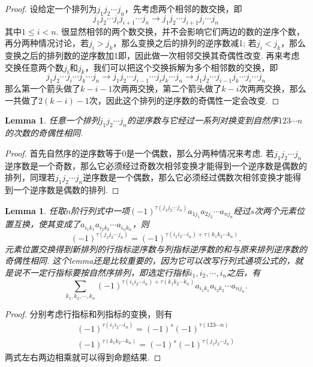 \documentclass{article}
\newtheorem{lemma}[theorem]{Lemma}
\begin{document}
\begin{proof}
设给定一个排列为$j_1j_2\cdots j_n$，先考虑两个相邻的数交换，即
$$
j_1j_2\cdots j_{i}j_{i+1}\cdots j_n \longrightarrow j_1j_2\cdots j_{i+1}j_{i}\cdots j_n
$$
其中$1\leq i <n$. 很显然相邻的两个数交换，并不会影响它们两边的数的逆序个数，再分两种情况讨论，若$j_i > j_k$，那么变换之后的排列的逆序数减1; 若$j_i < j_k$，那么变换之后的排列数的逆序数加1即，因此做一次相邻交换其奇偶性改变. 再来考虑交换任意两个数$j_i$和$j_k$，我们可以把这个交换拆解为多个相邻数的交换，即
$$
j_1j_2\cdots j_{i}\cdots j_{k}\cdots j_n \longrightarrow j_1j_2\cdots j_{i-1}\cdots j_{i}j_{k}\cdots j_n \longrightarrow j_1j_2\cdots j_{i-1}j_k\cdots j_{i}\cdots j_n
$$
那么第一个箭头做了$k-i-1$次两两交换，第二个箭头做了$k-i$次两两交换，那么一共做了$2(k-i)-1$次，因此这个排列的逆序数的奇偶性一定会改变.
\end{proof}

\begin{lemma}\label{det: nixu2}
\rm 任意一个排列$j_1j_2\cdots j_n$的逆序数与它经过一系列对换变到自然序$123\cdots n$的次数的奇偶性相同.
\end{lemma}

\begin{proof}
首先自然序的逆序数等于0是一个偶数，那么分两种情况来考虑. 若$j_1j_2\cdots j_n$逆序数是一个奇数，那么它必须经过奇数次相邻变换才能得到一个逆序数是偶数的排列，同理若$j_1j_2\cdots j_n$逆序数是一个偶数，那么它必须经过偶数次相邻变换才能得到一个逆序数是偶数的排列.
\end{proof}


\begin{lemma}\label{det: nixu3}
\rm 任取$n$阶行列式中一项$(-1)^{\tau(j_1j_2\cdots j_n)}a_{1j_1}a_{2j_2}\cdots a_{nj_n}$经过$s$次两个元素位置互换，使其变成了$a_{i_1k_1}a_{i_2k_2}\cdots a_{i_nk_n}$，则
$$
(-1)^{\tau(j_1j_2\cdots j_n)} = (-1)^{\tau(i_1i_2\cdots i_n)+\tau(k_1k_2\cdots k_n)}.
$$
{\color{blue} 元素位置交换得到新排列的行指标逆序数与列指标逆序数的和与原来排列逆序数的奇偶性相同}. {\color{red} 这个lemma还是比较重要的，因为它可以改写行列式通项公式的，就是说不一定行指标要按自然序排列}，即选定行指标$i_1,i_2,\cdots,i_n$之后，有
$$
\sum\limits_{k_1,k_2,\cdots,k_n}(-1)^{\tau(i_1i_2\cdots i_n) + \tau(k_1k_2\cdots k_n)}a_{i_1k_1}a_{i_2k_2}\cdots a_{nj_n}.
$$
\end{lemma}

\begin{proof}
分别考虑行指标和列指标的变换，则有
$$
\begin{array}{ll}
(-1)^{\tau(i_1i_2\cdots i_n)} = (-1)^s (-1)^{\tau(123\cdots n)} \\
(-1)^{\tau(k_1k_2\cdots k_n)} = (-1)^s (-1)^{\tau(j_1j_2\cdots j_n)}
\end{array}
$$
两式左右两边相乘就可以得到命题结果.
\end{proof}
\end{document}
